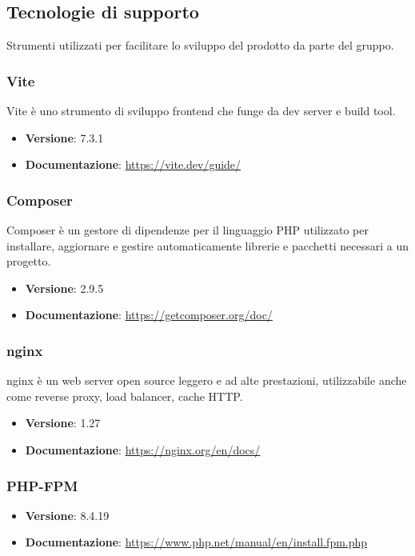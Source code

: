 \documentclass[a4paper,10pt]{article}
\begin{document}
\subsection{Tecnologie di supporto}
Strumenti utilizzati per facilitare lo sviluppo del prodotto da parte del gruppo.

\subsubsection{Vite}
Vite è uno strumento di sviluppo frontend che funge da dev server e build tool.
\begin{itemize}
    \item \textbf{Versione}: 7.3.1
    \item \textbf{Documentazione}: \url{https://vite.dev/guide/}
\end{itemize}

\subsubsection{Composer}
Composer è un gestore di dipendenze per il linguaggio PHP utilizzato per installare, aggiornare e gestire automaticamente librerie e pacchetti necessari a un progetto.
\begin{itemize}
    \item \textbf{Versione}: 2.9.5
    \item \textbf{Documentazione}: \url{https://getcomposer.org/doc/}
\end{itemize}

\subsubsection{nginx}
nginx è un web server open source leggero e ad alte prestazioni, utilizzabile anche come reverse proxy, load balancer, cache HTTP.
\begin{itemize}
    \item \textbf{Versione}: 1.27
    \item \textbf{Documentazione}: \url{https://nginx.org/en/docs/}
\end{itemize}

\subsubsection{PHP-FPM}

\begin{itemize}
    \item \textbf{Versione}: 8.4.19
    \item \textbf{Documentazione}: \url{https://www.php.net/manual/en/install.fpm.php}
\end{itemize}
\end{document}
